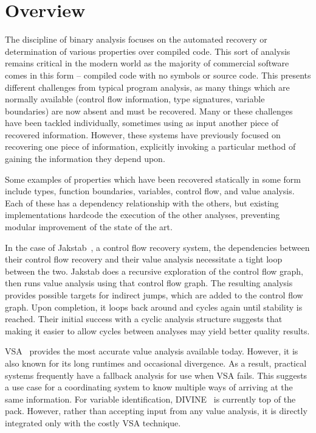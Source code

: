 
\section{Overview}
\label{sec:overview}
The discipline of binary analysis focuses on the automated recovery or determination of various properties over compiled code.
This sort of analysis remains critical in the modern world as the majority of commercial software comes in this form -- compiled code with no symbols or source code.
This presents different challenges from typical program analysis, as many things which are normally available (control flow information, type signatures, variable boundaries) are now absent and must be recovered.
Many or these challenges have been tackled individually, sometimes using as input another piece of recovered information.
However, these systems have previously focused on recovering one piece of information, explicitly invoking a particular method of gaining the information they depend upon.

Some examples of properties which have been recovered statically in some form include types, function boundaries, variables, control flow, and value analysis.
Each of these has a dependency relationship with the others, but existing implementations hardcode the execution of the other analyses, preventing modular improvement of the state of the art.

In the case of Jakstab~\cite{jakstab}, a control flow recovery system, the dependencies between their control flow recovery and their value analysis necessitate a tight loop between the two.
Jakstab does a recursive exploration of the control flow graph, then runs value analysis using that control flow graph.
The resulting analysis provides possible targets for indirect jumps, which are added to the control flow graph.
Upon completion, it loops back around and cycles again until stability is reached.
Their initial success with a cyclic analysis structure suggests that making it easier to allow cycles between analyses may yield better quality results.

VSA~\cite{vsa} provides the most accurate value analysis available today. However, it is also known for its long runtimes and occasional divergence.
As a result, practical systems frequently have a fallback analysis for use when VSA fails.
This suggests a use case for a coordinating system to know multiple ways of arriving at the same information.
For variable identification, DIVINE~\cite{divine} is currently top of the pack.
However, rather than accepting input from any value analysis, it is directly integrated only with the costly VSA technique.


